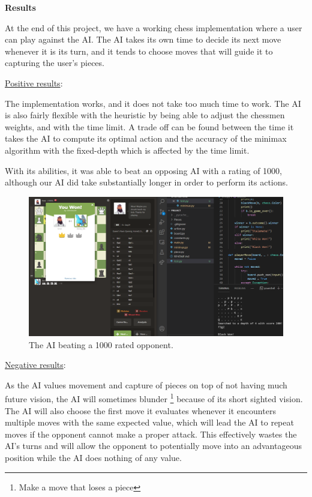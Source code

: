 \documentclass[12pt, letterpaper]{article}
\begin{document}
\clearpage

\textbf{Results}

\medskip

At the end of this project, we have a working chess implementation where a user can play against the AI.
The AI takes its own time to decide its next move whenever it is its turn, and it tends to choose moves
that will guide it to capturing the user's pieces. 

\medskip

\underline{Positive results}:

\medskip

The implementation works, and it does not take too much time to work. The AI is also fairly flexible with
the heuristic by being able to adjust the chessmen weights, and with the time limit. A trade off can be
found between the time it takes the AI to compute its optimal action and the accuracy of the minimax
algorithm with the fixed-depth which is affected by the time limit.

\medskip

With its abilities, it was able to beat an opposing AI with a rating of 1000, although our AI did take
substantially longer in order to perform its actions.

\begin{figure}[htb]
  \centering
  \includegraphics[width=\linewidth]{Figure_1.png}
  \caption{The AI beating a 1000 rated opponent.}
  \label{fig:ai1}
\end{figure}

\medskip

\underline{Negative results}:

\medskip

As the AI values movement and capture of pieces on top of not having much future vision, the AI will
sometimes blunder \footnote{Make a move that loses a piece} because of its short sighted vision.
The AI will also choose the first move it evaluates whenever it encounters multiple moves with the
same expected value, which will lead the AI to repeat moves if the opponent cannot make a proper attack.
This effectively wastes the AI's turns and will allow the opponent to potentially move into an advantageous
position while the AI does nothing of any value.
\end{document}
